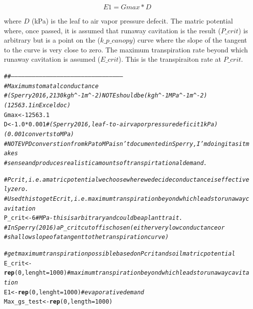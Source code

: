 \documentclass[a4paper]{article}\usepackage[]{graphicx}\usepackage[]{color}
\makeatletter
\newcommand{\hlnum}[1]{\textcolor[rgb]{0.686,0.059,0.569}{#1}}%
\newcommand{\hlcom}[1]{\textcolor[rgb]{0.678,0.584,0.686}{\textit{#1}}}%
\newcommand{\hlopt}[1]{\textcolor[rgb]{0,0,0}{#1}}%
\newcommand{\hlstd}[1]{\textcolor[rgb]{0.345,0.345,0.345}{#1}}%
\newcommand{\hlkwb}[1]{\textcolor[rgb]{0.69,0.353,0.396}{#1}}%
\newcommand{\hlkwc}[1]{\textcolor[rgb]{0.333,0.667,0.333}{#1}}%
\newcommand{\hlkwd}[1]{\textcolor[rgb]{0.737,0.353,0.396}{\textbf{#1}}}%
\newenvironment{kframe}{%
 \def\at@end@of@kframe{}%
 \ifinner\ifhmode%
  \def\at@end@of@kframe{\end{minipage}}%
  \begin{minipage}{\columnwidth}%
 \fi\fi%
 \def\FrameCommand##1{\hskip\@totalleftmargin \hskip-\fboxsep
 \colorbox{shadecolor}{##1}\hskip-\fboxsep
     \hskip-\linewidth \hskip-\@totalleftmargin \hskip\columnwidth}%
 \MakeFramed {\advance\hsize-\width
   \@totalleftmargin\z@ \linewidth\hsize
   \@setminipage}}%
 {\par\unskip\endMakeFramed%
 \at@end@of@kframe}
\newenvironment{knitrout}{}{} %
\makeatother
\begin{document}
\begin{equation}
E1 = Gmax * D
\end{equation}

\noindent where $D$ (kPa) is the leaf to air vapor pressure defecit. The matric potential where, once passed, it is assumed that runaway cavitation is the result ($P\_crit$) is arbitrary but is a point on the ($k\_p\_canopy$) curve where the slope of the tangent to the curve is very close to zero. The maximum transpiration rate beyond which runaway cavitation is assumed ($E\_crit$). This is the transpiraiton rate at $P\_crit$.   
\begin{knitrout}
\color{fgcolor}\begin{kframe}
\begin{alltt}
\hlcom{##-----------------------------------------------------------------------------------------------}
\hlcom{# Maximum stomatal conductance}
\hlcom{# (Sperry 2016, 2130 kg h^-1 m^-2) NOTE should be (kg h^-1 MPa^-1 m^-2) (12563.1 in Excel doc)}
\hlstd{Gmax} \hlkwb{<-} \hlnum{12563.1}
\hlstd{D} \hlkwb{<-} \hlnum{1.0}\hlopt{*}\hlnum{0.001} \hlcom{#(Sperry 2016, leaf-to-air vapor pressure deficit 1 kPa)(0.001 converts to MPa) }
\hlcom{# NOTE VPD converstion from kPa to MPa isn't documented in Sperry, I'm doing it as it makes }
\hlcom{# sense and produces realistic amounts of transpirtational demand. }

\hlcom{# Pcrit, i.e. a matric potential we choose where we decide conductance is effectively zero. }
\hlcom{# Used this to get Ecrit, i.e. maximum transpiration beyond which leads to runaway cavitation  }
\hlstd{P_crit} \hlkwb{<-} \hlnum{6} \hlcom{# MPa - this is arbitrary and could be a plant trait. }
\hlcom{# In Sperry (2016) a P_crit cutoff is chosen (either very low conductance or }
\hlcom{# shallow slope of a tangent to the transpiration curve)}

\hlcom{# get maximum transpiration possible based on Pcrit and soil matric potential }
\hlstd{E_crit} \hlkwb{<-} \hlkwd{rep}\hlstd{(}\hlnum{0}\hlstd{,} \hlkwc{lenght}\hlstd{=}\hlnum{1000}\hlstd{)} \hlcom{# maximum transpiration beyond which leads to runaway cavitation}
\hlstd{E1} \hlkwb{<-} \hlkwd{rep}\hlstd{(}\hlnum{0}\hlstd{,} \hlkwc{lenght}\hlstd{=}\hlnum{1000}\hlstd{)} \hlcom{# evaporative demand}
\hlstd{Max_gs_test} \hlkwb{<-} \hlkwd{rep}\hlstd{(}\hlnum{0}\hlstd{,}\hlkwc{length}\hlstd{=}\hlnum{1000}\hlstd{)}
\end{alltt}
\end{kframe}
\end{knitrout}
\end{document}
